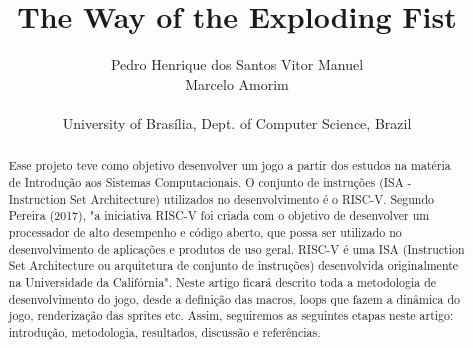 \documentclass[a4paper]{sbgames}
\begin{document}
\title{The Way of the Exploding Fist}



 \author{ Pedro Henrique dos Santos 
         \hspace{28pt} Vitor Manuel \\
         \hspace{28pt} Marcelo Amorim \\
         \vspace{0pt} \\
         {University of Brasília, Dept. of Computer Science, Brazil} }
        





\maketitle

\begin{abstract}
Esse projeto teve como objetivo desenvolver um jogo a partir dos estudos na matéria de Introdução aos Sistemas Computacionais. O conjunto de instruções (ISA - Instruction Set Architecture) utilizados no desenvolvimento é o RISC-V. Segundo Pereira (2017), "a iniciativa RISC-V foi criada com o objetivo de desenvolver um processador de alto desempenho e código aberto, que possa ser utilizado no desenvolvimento de aplicações e produtos de uso geral. RISC-V é uma ISA (Instruction Set Architecture ou arquitetura de conjunto de instruções) desenvolvida originalmente na Universidade da Califórnia". Neste artigo ficará descrito toda a metodologia de desenvolvimento do jogo, desde a definição das macros, loops que fazem a dinâmica do jogo, renderização das sprites etc. Assim, seguiremos as seguintes etapas neste artigo: introdução, metodologia, resultados, discussão e referências.

\end{abstract}
\end{document}
